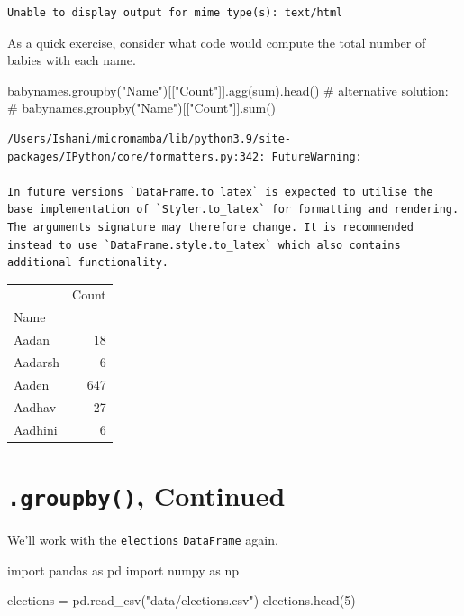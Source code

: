 \documentclass[
  letterpaper,
  DIV=11,
  numbers=noendperiod]{scrreprt}
\newenvironment{Shaded}{\begin{snugshade}}{\end{snugshade}}
\newcommand{\BuiltInTok}[1]{\textcolor[rgb]{0.00,0.23,0.31}{#1}}
\newcommand{\CommentTok}[1]{\textcolor[rgb]{0.37,0.37,0.37}{#1}}
\newcommand{\DecValTok}[1]{\textcolor[rgb]{0.68,0.00,0.00}{#1}}
\newcommand{\ImportTok}[1]{\textcolor[rgb]{0.00,0.46,0.62}{#1}}
\newcommand{\NormalTok}[1]{\textcolor[rgb]{0.00,0.23,0.31}{#1}}
\newcommand{\OperatorTok}[1]{\textcolor[rgb]{0.37,0.37,0.37}{#1}}
\newcommand{\StringTok}[1]{\textcolor[rgb]{0.13,0.47,0.30}{#1}}
\begin{document}
\begin{verbatim}
Unable to display output for mime type(s): text/html
\end{verbatim}

As a quick exercise, consider what code would compute the total number
of babies with each name.

\begin{Shaded}
\begin{Highlighting}[]
\NormalTok{babynames.groupby(}\StringTok{"Name"}\NormalTok{)[[}\StringTok{"Count"}\NormalTok{]].agg(}\BuiltInTok{sum}\NormalTok{).head()}
\CommentTok{\# alternative solution: }
\CommentTok{\# babynames.groupby("Name")[["Count"]].sum()}
\end{Highlighting}
\end{Shaded}

\begin{verbatim}
/Users/Ishani/micromamba/lib/python3.9/site-packages/IPython/core/formatters.py:342: FutureWarning:

In future versions `DataFrame.to_latex` is expected to utilise the base implementation of `Styler.to_latex` for formatting and rendering. The arguments signature may therefore change. It is recommended instead to use `DataFrame.style.to_latex` which also contains additional functionality.
\end{verbatim}

\begin{tabular}{lr}
\toprule
{} &  Count \\
Name    &        \\
\midrule
Aadan   &     18 \\
Aadarsh &      6 \\
Aaden   &    647 \\
Aadhav  &     27 \\
Aadhini &      6 \\
\bottomrule
\end{tabular}

\hypertarget{groupby-continued}{%
\section{\texorpdfstring{\texttt{.groupby()},
Continued}{.groupby(), Continued}}\label{groupby-continued}}

We'll work with the \texttt{elections} \texttt{DataFrame} again.

\begin{Shaded}
\begin{Highlighting}[]
\ImportTok{import}\NormalTok{ pandas }\ImportTok{as}\NormalTok{ pd}
\ImportTok{import}\NormalTok{ numpy }\ImportTok{as}\NormalTok{ np}

\NormalTok{elections }\OperatorTok{=}\NormalTok{ pd.read\_csv(}\StringTok{"data/elections.csv"}\NormalTok{)}
\NormalTok{elections.head(}\DecValTok{5}\NormalTok{)}
\end{Highlighting}
\end{Shaded}
\end{document}
